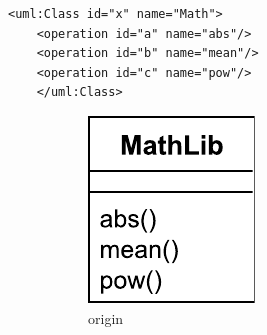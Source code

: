 \documentclass{jot}
\begin{document}
\vspace{-20pt}
\begin{minipage}[t]{0.59\linewidth} 
    \centering
    \begin{lstlisting}[style=eol,caption={The simplified XMI of the model in Fig. \ref{fig:origin}.},label=lst:originxmi]
    <uml:Class id="x" name="Math">
    <operation id="a" name="abs"/>
    <operation id="b" name="mean"/>
    <operation id="c" name="pow"/>
    </uml:Class>
    \end{lstlisting}
    \vspace{-25pt}
    \begin{figure}[H]
        \centering    
        \hfill
        \begin{subfigure}[t]{0.2\linewidth}
            \centering
            \includegraphics[width=\linewidth]{OriginalClassDiagram}
            \caption{origin}
            \label{fig:origin}
        \end{subfigure}
        \hfill
        \begin{subfigure}[t]{0.2\linewidth}
            \centering

\end{subfigure}
\end{figure}
\end{minipage}
\end{document}
